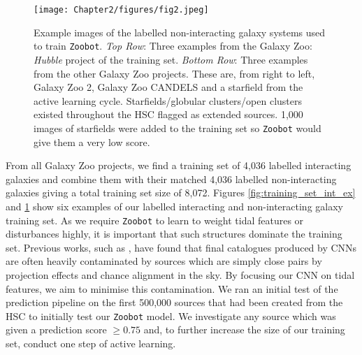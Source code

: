 \begin{figure}
  \centering
  \texttt{[image: Chapter2/figures/fig2.jpeg]}
  \caption[Example images of the labelled non-interacting galaxy systems used to train \texttt{Zoobot}]{Example images of the labelled non-interacting galaxy systems used to train \texttt{Zoobot}. \textit{Top Row}: Three examples from the Galaxy Zoo: \emph{Hubble} project of the training set. \textit{Bottom Row}: Three examples from the other Galaxy Zoo projects. These are, from right to left, Galaxy Zoo 2, Galaxy Zoo CANDELS and a starfield from the active learning cycle. Starfields/globular clusters/open clusters existed throughout the HSC flagged as extended sources. 1,000 images of starfields were added to the training set so \texttt{Zoobot} would give them a very low score.}
  \label{fig:training_set_non_ex}
\end{figure}

From all Galaxy Zoo projects, we find a training set of 4,036 labelled interacting galaxies and combine them with their matched 4,036 labelled non-interacting galaxies giving a total training set size of 8,072. Figures \ref{fig:training_set_int_ex} and \ref{fig:training_set_non_ex} show six examples of our labelled interacting and non-interacting galaxy training set. As we require \texttt{Zoobot} to learn to weight tidal features or disturbances highly, it is important that such structures dominate the training set. Previous works, such as \citet{2019A&A...631A..51P}, have found that final catalogues produced by CNNs are often heavily contaminated by sources which are simply close pairs by projection effects and chance alignment in the sky. By focusing our CNN on tidal features, we aim to minimise this contamination. We ran an initial test of the prediction pipeline on the first 500,000 sources that had been created from the HSC to initially test our \texttt{Zoobot} model. We investigate any source which was given a prediction score $\geq 0.75$ and, to further increase the size of our training set, conduct one step of active learning.

